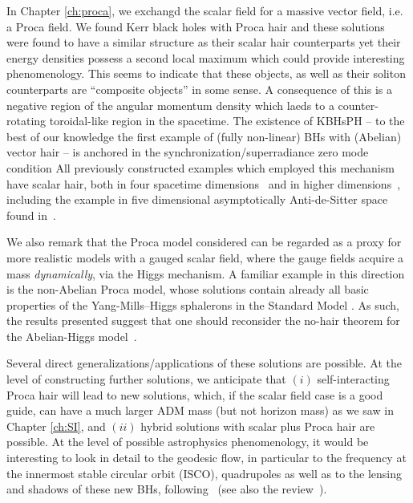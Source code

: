 In Chapter \ref{ch:proca}, we exchangd the scalar field for a massive vector field, i.e. a Proca field.
We found Kerr black holes with Proca hair and these solutions were found to have a similar structure as their scalar hair counterparts yet their energy densities possess a second local maximum which could provide interesting phenomenology.
This seems to indicate that these objects, as well as their soliton counterparts are ``composite objects'' in some sense.
A consequence of this is a negative region of the angular momentum density which laeds to a counter-rotating toroidal-like region in the spacetime.
The existence of KBHsPH -- to the best of our knowledge the first example of (fully non-linear)   
BHs with (Abelian) vector hair -- is anchored  in the synchronization/superradiance zero mode condition
%
All previously constructed examples which employed this mechanism have scalar hair, 
both in four spacetime dimensions~\cite{Herdeiro:2014goa,Herdeiro:2015gia,Kleihaus:2015iea,Herdeiro:2015tia} and in higher dimensions~\cite{Brihaye:2014nba,Herdeiro:2015kha}, 
including the example in five dimensional asymptotically Anti-de-Sitter space found in~\cite{Dias:2011at}. 

We also remark that  the Proca model considered can be regarded as a proxy 
for more realistic models with a gauged scalar field, where the gauge fields acquire a mass \textit{dynamically}, via the Higgs mechanism. A familiar example in this direction is the non-Abelian Proca model,
whose solutions contain already all basic properties of the Yang-Mills--Higgs sphalerons
in the Standard Model \cite{Greene:1992fw}. 
As such, the results presented suggest that one should
reconsider the no-hair theorem for the Abelian-Higgs model~\cite{Adler:1978dp}.

Several direct generalizations/applications of these solutions are possible. 
At the level of constructing further 
solutions, we anticipate that 
$(i)$ self-interacting Proca hair will lead to new solutions, 
which, if the scalar field case is a good guide, can have a much larger ADM mass (but not horizon mass) as we saw in Chapter \ref{ch:SI},
and
$(ii)$ hybrid solutions with scalar plus Proca hair are possible. 
At the level of possible astrophysics phenomenology, 
it would be interesting to look in detail to the geodesic flow, 
in particular to the frequency at the innermost stable circular orbit (ISCO), 
quadrupoles as well as to the lensing and shadows of these new BHs,
following~\cite{Cunha:2015yba} (see also the review~\cite{Johannsen:2015mdd}). 

